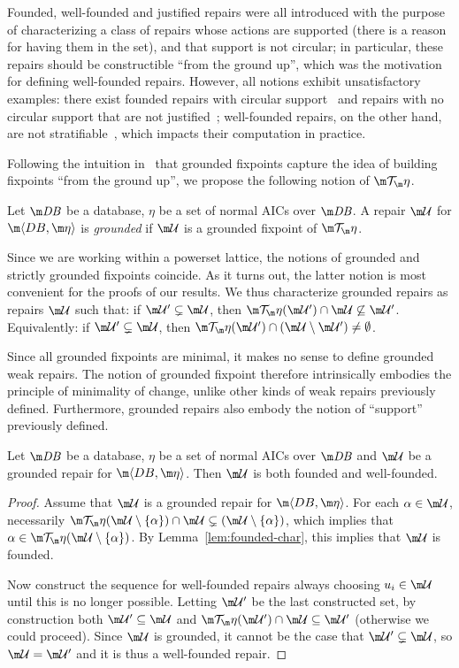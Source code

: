 
Founded, well-founded and justified repairs were all introduced with the purpose of characterizing a class of repairs whose actions are supported (there is a reason for having them in the set), and that support is not circular; in particular, these repairs should be constructible ``from the ground up'', which was the motivation for defining well-founded repairs.
However, all notions exhibit unsatisfactory examples: there exist founded repairs with circular support~\cite{Caroprese2011} and repairs with no circular support that are not justified~\cite{CEGN13}; well-founded repairs, on the other hand, are not stratifiable~\cite{lcf:14}, which impacts their computation in practice.

Following the intuition in~ that grounded fixpoints capture the idea of building fixpoints ``from the ground up'', we propose the following notion of $\Op$.

\begin{definition}
  Let $\db$ be a database, $\eta$ be a set of normal AICs over $\db$.
  A repair $\UU$ for $\fulldb$ is \emph{grounded} if $\UU$ is a grounded fixpoint of $\Op$.
\end{definition}

Since we are working within a powerset lattice, the notions of grounded and strictly grounded fixpoints coincide.
As it turns out, the latter notion is most convenient for the proofs of our results.
We thus characterize grounded repairs as repairs $\UU$ such that: if $\UU'\subsetneq\UU$, then $\Op(\UU')\cap\UU\not\subseteq\UU'$.
Equivalently: if $\UU'\subsetneq\UU$, then $\Op(\UU')\cap(\UU\setminus\UU')\neq\emptyset$.

Since all grounded fixpoints are minimal, it makes no sense to define grounded weak repairs.
The notion of grounded fixpoint therefore intrinsically embodies the principle of minimality of change, unlike other kinds of weak repairs previously defined.
Furthermore, grounded repairs also embody the notion of ``support'' previously defined.

\begin{lemma}
  \label{lem:founded}
  Let $\db$ be a database, $\eta$ be a set of normal AICs over $\db$ and $\UU$ be a grounded repair for $\fulldb$.
  Then $\UU$ is both founded and well-founded.
\end{lemma}
\begin{proof}
  Assume that $\UU$ is a grounded repair for $\fulldb$.
  For each $\alpha\in\UU$, necessarily $\Op(\UU\setminus\{\alpha\})\cap\UU\subsetneq(\UU\setminus\{\alpha\})$, which implies that $\alpha\in\Op(\UU\setminus\{\alpha\})$.
  By Lemma~\ref{lem:founded-char}, this implies that $\UU$ is founded.

  Now construct the sequence for well-founded repairs always choosing $u_i\in\UU$ until this is no longer possible.
  Letting $\UU'$ be the last constructed set, by construction both $\UU'\subseteq\UU$ and $\Op(\UU')\cap\UU\subseteq\UU'$ (otherwise we could proceed).
  Since $\UU$ is grounded, it cannot be the case that $\UU'\subsetneq\UU$, so $\UU=\UU'$ and it is thus a well-founded repair.
\end{proof}

